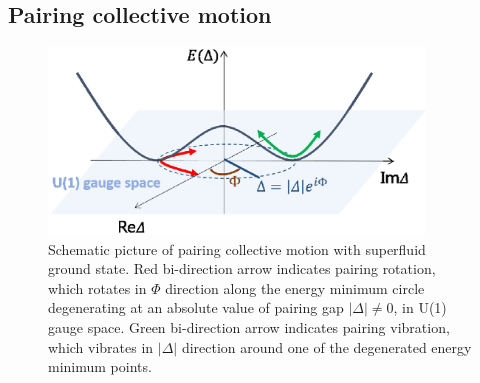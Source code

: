 \documentclass[11pt]{book} %
\begin{document}


\subsection{Pairing collective motion}
\label{1-1-2}

\begin{figure}[bt]
 \begin{center}
    \includegraphics[width=100mm]{images/pair_coll.eps}
 \end{center}
  \caption{Schematic picture of pairing collective motion with superfluid ground state. Red  bi-direction arrow indicates pairing rotation, which rotates in $\Phi$ direction along the energy minimum circle degenerating at an absolute value of pairing gap $|\Delta|\neq 0$, in U(1) gauge space. Green bi-direction arrow indicates pairing vibration, which vibrates in $|\Delta|$ direction around one of the degenerated energy minimum points.}
  \label{Pair_coll}
\end{figure}
\end{document}
